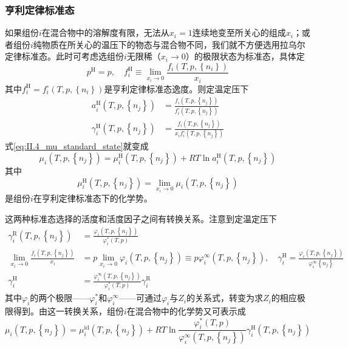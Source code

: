 \documentclass[main.tex]{subfiles}
\begin{document}
\subsubsection{亨利定律标准态}
如果组份$i$在混合物中的溶解度有限，无法从$x_i=1$连续地变至所关心的组成$x_i$；或者组份$i$纯物质在所关心的温压下的物态与混合物不同，我们就不方便选用拉乌尔定律标准态。此时可考虑选组份$i$无限稀（$x_i\rightarrow 0$）的极限状态为标准态，具体定
\[p^\text{H}=p,\quad f_i^\text{H}\equiv\lim_{x_i\to 0}\frac{f_i\left(T,p,\left\{n_i\right\}\right)}{x_i}\]
其中$f_i^\text{H}=f_i^\circ\left(T,p,\left\{n_i\right\}\right)$是亨利定律标准态逸度。则定温定压下
\begin{align*}
    a_i^\text{H}\left(T,p,\left\{n_j\right\}\right)      & =\frac{f_i\left(T,p,\left\{n_j\right\}\right)}{f_i^\circ\left(T,p,\left\{n_j\right\}\right)}    \\
    \gamma_i^\text{H}\left(T,p,\left\{n_j\right\}\right) & =\frac{f_i\left(T,p,\left\{n_j\right\}\right)}{x_if_i^\circ\left(T,p,\left\{n_j\right\}\right)}
\end{align*}
式\eqref{eq:II.4_mu_standard_state}就变成
\begin{equation}\label{eq:II.4_Henry_standard_state_activity}
    \mu_i\left(T,p,\left\{n_j\right\}\right) =\mu_i^\text{H}\left(T,p,\left\{n_j\right\}\right)+RT\ln a_i^\text{H}\left(T,p,\left\{n_j\right\}\right)
\end{equation}
其中
\[\mu_i^\text{H}\left(T,p,\left\{n_j\right\}\right)=\lim_{x_i\to 0}\mu_i\left(T,p,\left\{n_j\right\}\right)\]
是组份$i$在亨利定律标准态下的化学势。

这两种标准态选择的活度和活度因子之间有转换关系。注意到定温定压下
\begin{align*}
    \gamma_i^\text{R}\left(T,p,\left\{n_j\right\}\right)              & =\frac{\varphi_i\left(T,p,\left\{n_j\right\}\right)}{\varphi_i^*\left(T,p\right)}                                                                                                                                                       \\
    \lim_{x_i\to 0}\frac{f_i\left(T,p,\left\{n_j\right\}\right)}{x_i} & =p\lim_{x_i\to 0}\varphi_i\left(T,p,\left\{n_j\right\}\right)\equiv p\varphi_i^\infty\left(T,p,\left\{n_j\right\}\right),\quad\gamma_i^\text{H}=\frac{\varphi_i\left(T,p,\left\{n_j\right\}\right)}{\varphi_i^\infty\left\{n_j\right\}} \\
    \gamma_i^\text{H}                                                 & =\frac{\varphi_i^\infty\left(T,p,\left\{n_j\right\}\right)}{\varphi_i^*\left(T,p\right)}\gamma_i^\text{R}
\end{align*}
其中$\varphi_i$的两个极限——$\varphi_i^*$和$\varphi_i^\infty$——可通过$\varphi_i$与$Z_i$的关系式，转变为求$Z_i$的相应极限得到。由这一转换关系，组份$i$在混合物中的化学势又可表示成
\begin{equation}\label{eq:II.4_Henry_standardstate_activity_factor}
    \mu_i\left(T,p,\left\{n_j\right\}\right)=\mu_i^\text{id}\left(T,p,\left\{n_j\right\}\right)+RT\ln\frac{\varphi_i^*\left(T,p\right)}{\varphi_i^\infty\left(T,p,\left\{n_j\right\}\right)}\gamma_i^\text{H}\left(T,p,\left\{n_j\right\}\right)
\end{equation}
\end{document}
